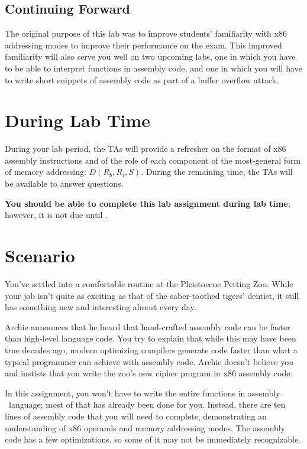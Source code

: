\subsection*{Continuing Forward}

The original purpose of this lab was to improve students' familiarity with
x86 addressing modes to improve their performance on the exam. This improved
familiarity will also serve you well on two upcoming labs, one in which you have
to be able to interpret functions in assembly code, and one in which you will
have to write short snippets of assembly code as part of a buffer overflow
attack.

\section*{During Lab Time}

During your lab period, the TAs will provide a refresher on the format of x86
assembly instructions and of the role of each component of the most-general
form of memory addressing: $D(R_b, R_i, S)$. During the remaining time, the TAs
will be available to answer questions.

\textbf{You should be able to complete this lab assignment during lab time};
however, it is not due until \duedate.

\section*{Scenario}

You've settled into a comfortable routine at the Pleistocene Petting Zoo. While
your job isn't quite as exciting as that of the saber-toothed tigers' dentist,
it still has something new and interesting almost every day.

Archie announces that he heard that hand-crafted assembly code can be faster
than high-level language code. You try to explain that while this may have been
true decades ago, modern optimizing compilers generate code faster than what a
typical programmer can achieve with assembly code. Archie doesn't believe you
and instists that you write the zoo's new cipher program in x86 assembly code.

\hspace{1cm}

In this assignment, you won't have to write the entire functions in assembly \
language; most of that has already been done for you. Instead, there are ten
lines of assembly code that you will need to complete, demonstrating an
understanding of x86 operands and memory addressing modes. The assembly code
has a few optimizations, so some of it may not be immediately recognizable.


